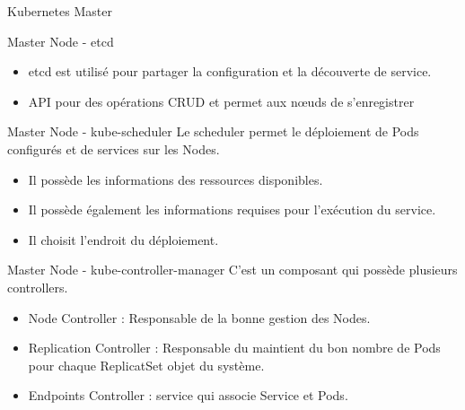 \documentclass{bredelebeamer}
\begin{document}
\begin{frame}{Kubernetes Master}

\begin{block}{Master Node - etcd}
\begin{itemize}
\item etcd est utilisé pour partager la configuration et la découverte de service.
\item API pour des opérations CRUD et permet aux nœuds de s'enregistrer %
\end{itemize}
\end{block} \pause

\begin{block}{Master Node - kube-scheduler}
Le scheduler permet le déploiement de Pods configurés et de services sur les Nodes.
\begin{itemize}
\item Il possède les informations des ressources disponibles.
\item Il possède également les informations requises pour l'exécution du service.
\item Il choisit l'endroit du déploiement.
\end{itemize}
\end{block} \pause


\begin{block}{Master Node - kube-controller-manager}
C'est un composant qui possède plusieurs controllers.
\begin{itemize}
\item Node Controller : Responsable de la bonne gestion des Nodes.
\item Replication Controller : Responsable du maintient du bon nombre de Pods pour chaque ReplicatSet objet du système.
\item Endpoints Controller : service qui associe Service et Pods.
\end{itemize}
\end{block}


\end{frame}
\end{document}
